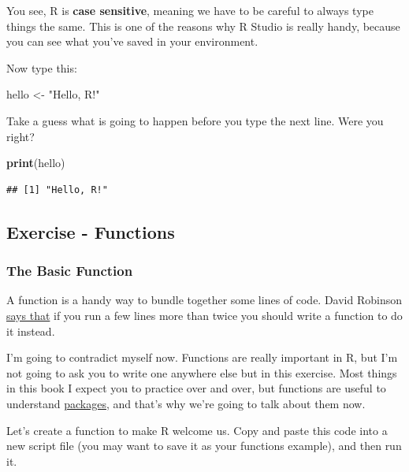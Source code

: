 \documentclass[
]{book}
\newenvironment{Shaded}{\begin{snugshade}}{\end{snugshade}}
\newcommand{\KeywordTok}[1]{\textcolor[rgb]{0.13,0.29,0.53}{\textbf{#1}}}
\newcommand{\NormalTok}[1]{#1}
\newcommand{\StringTok}[1]{\textcolor[rgb]{0.31,0.60,0.02}{#1}}
\begin{document}
You see, R is \textbf{case sensitive}, meaning we have to be careful to always type things the same. This is one of the reasons why R Studio is really handy, because you can see what you've saved in your environment.

Now type this:

\begin{Shaded}
\begin{Highlighting}[]
\NormalTok{hello <-}\StringTok{ "Hello, R!"}
\end{Highlighting}
\end{Shaded}

Take a guess what is going to happen before you type the next line. Were you right?

\begin{Shaded}
\begin{Highlighting}[]
\KeywordTok{print}\NormalTok{(hello)}
\end{Highlighting}
\end{Shaded}

\begin{verbatim}
## [1] "Hello, R!"
\end{verbatim}

\hypertarget{ex_func}{%
\subsection{Exercise - Functions}\label{ex_func}}

\hypertarget{the-basic-function}{%
\subsubsection{The Basic Function}\label{the-basic-function}}

A function is a handy way to bundle together some lines of code. David Robinson \href{https://twitter.com/drob/status/928447584712253440?s=20}{says that} if you run a few lines more than twice you should write a function to do it instead.

I'm going to contradict myself now. Functions are really important in R, but I'm not going to ask you to write one anywhere else but in this exercise. Most things in this book I expect you to practice over and over, but functions are useful to understand \protect\hyperlink{packages}{packages}, and that's why we're going to talk about them now.

Let's create a function to make R welcome us. Copy and paste this code into a new script file (you may want to save it as your functions example), and then run it.
\end{document}
